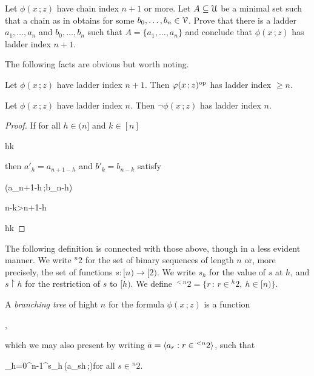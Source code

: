 \documentclass[scombinatorics.tex]{subfiles}
\begin{document}
\begin{exercise}
  Let $\phi(x\,;z)$ have chain index $n+1$ or more. 
  Let $A\subseteq\U$ be a minimal set such that a chain as in  obtains for some $b_0,\dots,b_n\in\V$.
  Prove that there is a ladder $a_1,\dots,a_n$ and $b_0,\dots,b_n$ such that $A=\{a_1,\dots,a_n\}$ and conclude that $\phi(x\,;z)$ has ladder index $n+1$.\QED
\end{exercise}

The following facts are obvious but worth noting.

\begin{fact}\label{fact_stability_dual}
  Let $\phi(x\,;z)$ have ladder index $n+1$. 
  Then $\phi(x\,;z)^{\rm op}$ has ladder index $\ge n$.\QED
\end{fact}
 
\begin{fact}\label{fact_stability_neg}
  Let $\phi(x\,;z)$ have ladder index $n$. 
  Then $\neg\phi(x\,;z)$ has ladder index $n$.\QED
\end{fact}

\begin{proof}
  If for all $h\in(n]$ and $k\in[n]$ 

  {\IFF}
  {h\le k}

  then $a'_h=a_{n+1-h}$ and $b'_k=b_{n-k}$ satisfy

  {\IFF}
  {\phi(a_{n+1-h}\,;b_{n-h})}

  \ceq{}
  {\IFF}
  {n-k>n+1-h}

  \ceq{}
  {\IFF}
  {h\le k}
\end{proof}
 
The following definition is connected with those above, though in a less evident manner.
We write ${}^n2$ for the set of binary sequences of length $n$ or, more precisely, the set of functions $s:[n)\to[2)$.
We write $s_h$ for the value of $s$ at $h$, and $s{\restriction} h$ for the restriction of $s$ to $[h)$.
We define ${}^{<n}2=\big\{r\, :\, r\in {}^h2,\ h\in[n)\big\}$.

A \emph{branching tree\/} of hight $n$ for the formula $\phi(x\,;z)$ is a function 

\nopagebreak[4]\par
{},

which we may also present by writing $\bar a=\<a_r:r\in{}^{<n}2\>$, such that

{\neq}
{\bigcap_{h=0}^{n-1}\neg^{s_h}\,\phi(a_{s\restriction h}\,;\V)}\hfill for all $s\in {}^n2$.
\end{document}
